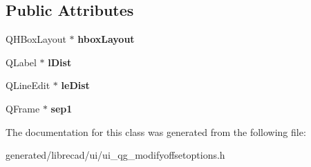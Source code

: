 \subsection*{Public Attributes}
\begin{DoxyCompactItemize}
\item 
\hypertarget{classUi__QG__ModifyOffsetOptions_ab79ea02abe27ab3a02b26b873b40aecb}{Q\-H\-Box\-Layout $\ast$ {\bfseries hbox\-Layout}}\label{classUi__QG__ModifyOffsetOptions_ab79ea02abe27ab3a02b26b873b40aecb}

\item 
\hypertarget{classUi__QG__ModifyOffsetOptions_a67bec5c3780b1f4160193e8b7d210142}{Q\-Label $\ast$ {\bfseries l\-Dist}}\label{classUi__QG__ModifyOffsetOptions_a67bec5c3780b1f4160193e8b7d210142}

\item 
\hypertarget{classUi__QG__ModifyOffsetOptions_a002976b8b010b3784de915cf1c03bf26}{Q\-Line\-Edit $\ast$ {\bfseries le\-Dist}}\label{classUi__QG__ModifyOffsetOptions_a002976b8b010b3784de915cf1c03bf26}

\item 
\hypertarget{classUi__QG__ModifyOffsetOptions_a7e95c627b76ee96369b098716f44cf5b}{Q\-Frame $\ast$ {\bfseries sep1}}\label{classUi__QG__ModifyOffsetOptions_a7e95c627b76ee96369b098716f44cf5b}

\end{DoxyCompactItemize}


The documentation for this class was generated from the following file\-:\begin{DoxyCompactItemize}
\item 
generated/librecad/ui/ui\-\_\-qg\-\_\-modifyoffsetoptions.\-h\end{DoxyCompactItemize}
